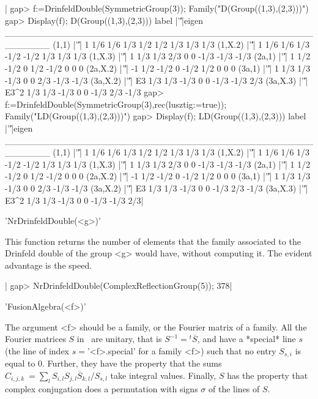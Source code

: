 |    gap> f:=DrinfeldDouble(SymmetricGroup(3));
    Family("D(Group((1,3),(2,3)))")
    gap> Display(f);
    D(Group((1,3),(2,3)))
       label |'\|'|eigen
    _______________________________________________________
    (1,1)    |'\|'|    1 1/6  1/6  1/3  1/2  1/2  1/3  1/3  1/3
    (1,X.2)  |'\|'|    1 1/6  1/6  1/3 -1/2 -1/2  1/3  1/3  1/3
    (1,X.3)  |'\|'|    1 1/3  1/3  2/3    0    0 -1/3 -1/3 -1/3
    (2a,1)   |'\|'|    1 1/2 -1/2    0  1/2 -1/2    0    0    0
    (2a,X.2) |'\|'|   -1 1/2 -1/2    0 -1/2  1/2    0    0    0
    (3a,1)   |'\|'|    1 1/3  1/3 -1/3    0    0  2/3 -1/3 -1/3
    (3a,X.2) |'\|'|   E3 1/3  1/3 -1/3    0    0 -1/3 -1/3  2/3
    (3a,X.3) |'\|'| E3^2 1/3  1/3 -1/3    0    0 -1/3  2/3 -1/3
    gap> f:=DrinfeldDouble(SymmetricGroup(3),rec(lusztig:=true));
    Family("LD(Group((1,3),(2,3)))")
    gap> Display(f);
    LD(Group((1,3),(2,3)))
       label |'\|'|eigen
    _______________________________________________________
    (1,1)    |'\|'|    1 1/6  1/6  1/3  1/2  1/2  1/3  1/3  1/3
    (1,X.2)  |'\|'|    1 1/6  1/6  1/3 -1/2 -1/2  1/3  1/3  1/3
    (1,X.3)  |'\|'|    1 1/3  1/3  2/3    0    0 -1/3 -1/3 -1/3
    (2a,1)   |'\|'|    1 1/2 -1/2    0  1/2 -1/2    0    0    0
    (2a,X.2) |'\|'|   -1 1/2 -1/2    0 -1/2  1/2    0    0    0
    (3a,1)   |'\|'|    1 1/3  1/3 -1/3    0    0  2/3 -1/3 -1/3
    (3a,X.2) |'\|'|   E3 1/3  1/3 -1/3    0    0 -1/3  2/3 -1/3
    (3a,X.3) |'\|'| E3^2 1/3  1/3 -1/3    0    0 -1/3 -1/3  2/3|


'NrDrinfeldDouble(<g>)'

This function returns the number of elements that the family associated to the
Drinfeld double of the group <g> would have, without computing it. The evident
advantage is the speed.

|    gap> NrDrinfeldDouble(ComplexReflectionGroup(5));
    378|


'FusionAlgebra(<f>)'

The argument <f> should be a family, or the Fourier matrix of a family. All
the Fourier matrices $S$ in \CHEVIE\ are unitary, that is
$S^{-1}={}^t{\overline  S}$, and  have a  *special* line  $s$ (the  line of
index  $s=$'<f>.special' for a family <f>)  such that no entry $S_{s,i}$ is
equal to $0$. Further, they have the property that the sums
$C_{i,j,k}\:=\sum_l   S_{i,l}   S_{j,l}{\overline   S}_{k,l}/S_{s,l}$  take
integral  values. Finally,  $S$ has  the property  that complex conjugation
does a permutation with signs $\sigma$ of the lines of $S$.

